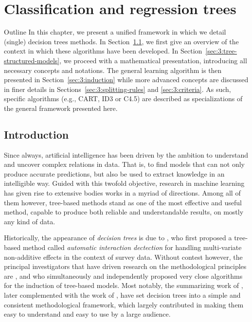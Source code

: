 \chapter{Classification and regression trees}\label{ch:cart}

\begin{remark}{Outline}
In this chapter, we present a unified framework in which we detail (single)
decision trees methods. In Section~\ref{sec:3:introduction}, we first give an
overview of the context in which these algorithms have been developed. In
Section~\ref{sec:3:tree-structured-models}, we proceed with a mathematical
presentation, introducing all necessary concepts and notations. The general
learning algorithm is then presented in Section~\ref{sec:3:induction} while
more advanced concepts are discussed in finer details in Sections~\ref{sec:3:splitting-rules}
and \ref{sec:3:criteria}. As such, specific algorithms (e.g.,
CART, ID3 or C4.5) are described as specializations of the general framework
presented here.
\end{remark}

\section{Introduction}
\label{sec:3:introduction}

Since always, artificial intelligence has been driven by the ambition to
understand and uncover complex relations in data. That is, to find models that
can not only produce accurate predictions, but also be used to extract
knowledge in an intelligible way. Guided with this twofold objective, research
in machine learning has given rise to extensive bodies works in a myriad of
directions. Among all of them however, tree-based methods stand as one of
the most effective and useful method, capable to produce both reliable and
understandable results, on mostly any kind of data.

Historically, the appearance of \textit{decision trees} is due to
\citet{morgan:1963}, who first proposed a tree-based method called
\textit{automatic interaction dectection} for handling multi-variate
non-additive effects in the context of survey data. Without contest however, the
principal investigators that have driven research on the methodological
principles  are \citet{breiman:1978a,breiman:1978b},
\citet{friedman:1977,friedman:1979} and \citet{quinlan:1979,quinlan:1986} who
simultaneously and independently proposed very close algorithms for the
induction of tree-based models. Most notably, the summarizing work of
\citet{breiman:1984}, later complemented with the work of \citet{quinlan:1993},
have set decision trees into a simple and consistent methodological framework,
which largely contributed in making them easy to understand and easy to use by
a large audience.

